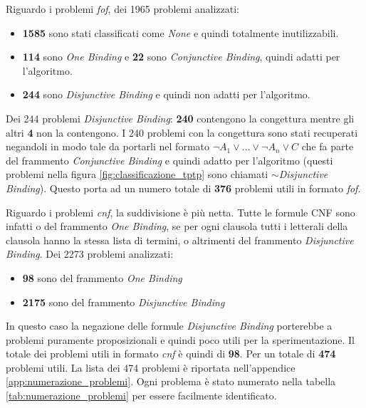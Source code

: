 \documentclass[./main.tex]{subfiles}
\begin{document}
Riguardo i problemi \textit{fof}, dei 1965 problemi analizzati:
\begin{itemize}
    \item \textbf{1585} sono stati classificati come \textit{None} e quindi totalmente inutilizzabili.
    \item \textbf{114} sono \textit{One Binding} e \textbf{22} sono \textit{Conjunctive Binding}, quindi adatti per l'algoritmo.
    \item \textbf{244} sono \textit{Disjunctive Binding} e quindi non adatti per l'algoritmo.
\end{itemize}
Dei 244 problemi \textit{Disjunctive Binding}: \textbf{240} contengono la congettura mentre gli altri \textbf{4} non la contengono.
I 240 problemi con la congettura sono stati recuperati negandoli in modo tale da portarli nel formato $\lnot A_1 \lor ... \lor \lnot A_n \lor C$ 
che fa parte del frammento \textit{Conjunctive Binding} e quindi adatto per l'algoritmo 
(questi problemi nella figura \ref{fig:classificazione_tptp} sono chiamati \textit{$\sim$Disjunctive Binding}).
Questo porta ad un numero totale di \textbf{376} problemi utili in formato \textit{fof}.

Riguardo i problemi \textit{cnf}, la suddivisione è più netta.
Tutte le formule CNF sono infatti o del frammento \textit{One Binding}, se per ogni clausola
tutti i letterali della clausola hanno la stessa lista di termini, o altrimenti del frammento \textit{Disjunctive Binding}.
Dei 2273 problemi analizzati:
\begin{itemize}
    \item \textbf{98} sono del frammento \textit{One Binding}
    \item \textbf{2175} sono del frammento \textit{Disjunctive Binding}
\end{itemize}
In questo caso la negazione delle formule \textit{Disjunctive Binding} porterebbe a problemi puramente proposizionali e quindi poco utili per la sperimentazione.
Il totale dei problemi utili in formato \textit{cnf} è quindi di \textbf{98}. Per un totale di \textbf{474} problemi utili.
La lista dei 474 problemi è riportata nell'appendice \ref{app:numerazione_problemi}.
Ogni problema è stato numerato nella tabella \ref{tab:numerazione_problemi} per essere facilmente identificato.


\end{document}
